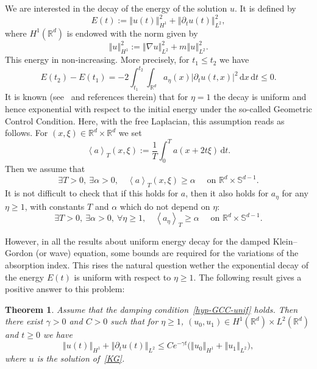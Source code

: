 \documentclass[10pt]{amsart}
\newtheorem{theo}{Theorem}[section]
\theoremstyle{definition}\newtheorem{defi}[theo]{Definition}\newtheorem{rema}[theo]{Remark}\newtheorem{exam}[theo]{Example}\newtheorem{exem}[theo]{Example}\newtheorem{nota}[theo]{Notation}
\newcommand{\abs}[1]{\left\vert #1\right\vert}
\newcommand{\nr}[1]{\left\Vert #1\right\Vert}
\newcommand{\pppg}[1] {\left< #1 \right>}
\renewcommand{\leq}{\leqslant}
\renewcommand{\geq}{\geqslant}
\newcommand{\1}{\mathds 1}
\newcommand{\R}{\mathbb{R}}
\renewcommand{\a}{\alpha}
\newcommand{\g}{\gamma}
\newcommand{\x}{\xi}
\newcommand{\dd}{\mathrm{d}}
\newcommand{\dx}{\dd x}
\newcommand{\dt}{\dd t}
\let\oldexists\exists
\renewcommand*{\exists}{\mathrel{\oldexists}}
\let\oldforall\forall
\renewcommand*{\forall}{\mathrel{\oldforall}}
\begin{document}
We are interested in the decay of the energy of the solution $u$. It is defined by
\[
E(t) := \nr{u(t)}_{H^1}^2 + \nr{\partial_t u(t)}_{L^2}^2,
\]
where $H^1(\R^d)$ is endowed with the norm given by
\begin{equation}\label{def-norme-H1}
\nr{u}_{H^1}^2 := \nr{\nabla u}_{L^2}^2 + m \nr{u}_{L^2}^2.
\end{equation}
This energy in non-increasing. More precisely, for $t_1 \leq t_2$ we have
\[
E(t_2) - E(t_1) = -2 \int_{t_1}^{t_2} \int_{\R^d} a_\eta(x) \abs{\partial_t u(t,x)}^2 \, \dx \, \dt \leq 0.
\]
It is known (see~\cite{BurqJo} and references therein) that for $\eta = 1$ the decay is uniform and hence exponential with respect to the initial energy under the so-called Geometric Control Condition. Here, with the free Laplacian, this assumption reads as follows. For $(x,\x) \in \R^d \times \R^d$ we set
\[
\pppg {a}_T (x,\x) := \frac 1 T \int_0^T a(x+2t\x) \, \dt.
\]
Then we assume that
\begin{equation}\label{hyp-GCC-usual}
\exists T > 0,\ \exists \a > 0, \quad \pppg {a}_T (x,\x) \geq \a\quad \text{ on } \R^{d} \times \mathbb S^{d-1}.
\end{equation}
It is not difficult to check that if this holds for $a$, then it also holds for $a_\eta$ for any $\eta \geq 1$, with constants $T$ and $\a$ which do not depend on $\eta$:
\begin{equation}\label{hyp-GCC-unif}
\exists T > 0,\ \exists \a > 0,\ \forall \eta \geq 1, \quad \pppg {a_\eta}_T \geq \a \quad \text{ on } \R^{d} \times \mathbb S^{d-1}.
\end{equation}

However, in all the results about uniform energy decay for the damped Klein--Gordon (or wave) equation, some bounds are required for the variations of the absorption index. This rises the natural question wether the exponential decay of the energy $E(t)$ is uniform with respect to $\eta \geq 1$. The following result gives a positive answer to this problem:

\begin{theo}\label{th-unif-decay}
Assume that the damping condition~\eqref{hyp-GCC-unif} holds. Then there exist $\g > 0$ and $C > 0$ such that for $\eta \geq 1$, $(u_0,u_1) \in H^1(\R^d) \times L^2(\R^d)$ and $t \geq 0$ we have
\[
\nr{u(t)}_{H^1} + \nr{\partial_t u(t)}_{L^2} \leq C e^{-\g t} \big(\nr{u_0}_{H^1} + \nr{u_1}_{L^2} \big),
\]
where $u$ is the solution of~\eqref{KG}.
\end{theo}
\end{document}
